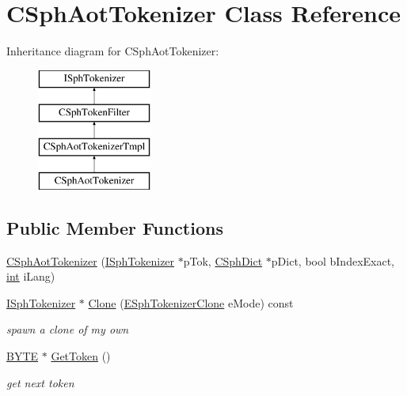 \hypertarget{classCSphAotTokenizer}{\section{C\-Sph\-Aot\-Tokenizer Class Reference}
\label{classCSphAotTokenizer}
}
Inheritance diagram for C\-Sph\-Aot\-Tokenizer\-:\begin{figure}[H]
\begin{center}
\leavevmode
\includegraphics[height=4.000000cm]{classCSphAotTokenizer}
\end{center}
\end{figure}
\subsection*{Public Member Functions}
\begin{DoxyCompactItemize}
\item 
\hyperlink{classCSphAotTokenizer_af5e0e930d44cc1dfbc565336d382ed8c}{C\-Sph\-Aot\-Tokenizer} (\hyperlink{classISphTokenizer}{I\-Sph\-Tokenizer} $\ast$p\-Tok, \hyperlink{classCSphDict}{C\-Sph\-Dict} $\ast$p\-Dict, bool b\-Index\-Exact, \hyperlink{sphinxexpr_8cpp_a4a26e8f9cb8b736e0c4cbf4d16de985e}{int} i\-Lang)
\item 
\hyperlink{classISphTokenizer}{I\-Sph\-Tokenizer} $\ast$ \hyperlink{classCSphAotTokenizer_a1110bf3dbd8e8ffb85809f1c48d78d35}{Clone} (\hyperlink{sphinx_8h_adc6a6e1ffce224f14950be604087978c}{E\-Sph\-Tokenizer\-Clone} e\-Mode) const 
\begin{DoxyCompactList}\small\item\em spawn a clone of my own \end{DoxyCompactList}\item 
\hyperlink{sphinxstd_8h_a4ae1dab0fb4b072a66584546209e7d58}{B\-Y\-T\-E} $\ast$ \hyperlink{classCSphAotTokenizer_a7996e06ca045645ce0ccbcdfec1dfbc0}{Get\-Token} ()
\begin{DoxyCompactList}\small\item\em get next token \end{DoxyCompactList}\end{DoxyCompactItemize}

